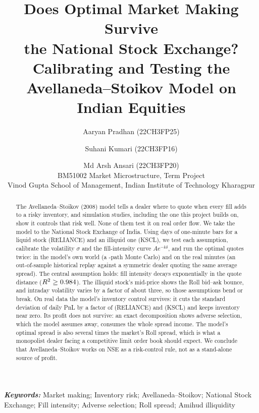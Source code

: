 \documentclass[11pt]{article}
\title{Does Optimal Market Making Survive\\ the National Stock Exchange?\\[4pt]
\large Calibrating and Testing the Avellaneda--Stoikov Model on Indian Equities}
\author{Aaryan Pradhan (22CH3FP25) \and Suhani Kumari (22CH3FP16) \and Md Arsh Ansari (22CH3FP20)\\[6pt]
\small BM51002 Market Microstructure, Term Project\\
\small Vinod Gupta School of Management, Indian Institute of Technology Kharagpur}
\date{}
\begin{document}
\maketitle

\begin{abstract}
\noindent The Avellaneda--Stoikov (2008) model tells a dealer where to quote when every fill adds to a
risky inventory, and simulation studies, including the one this project builds on, show it controls
that risk well. None of them test it on real order flow. We take the model to the National Stock
Exchange of India. Using \RELIANCEDays{} days of one-minute bars for a liquid stock (RELIANCE) and an
illiquid one (KSCL), we test each assumption, calibrate the volatility $\sigma$ and the fill-intensity
curve $Ae^{-k\delta}$, and run the optimal quotes twice: in the model's own world (a
\Paths-path Monte Carlo) and on the real minutes (an out-of-sample historical replay against a
symmetric dealer quoting the same average spread). The central assumption holds: fill intensity
decays exponentially in the quote distance ($R^2 \ge 0.984$). The illiquid stock's mid-price
shows the Roll bid--ask bounce, and intraday volatility varies by a factor of about three, so
those assumptions bend or break. On real data the model's inventory control survives: it cuts
the standard deviation of daily PnL by a factor of \RELIANCEReplaySdFactor{} (RELIANCE) and
\KSCLReplaySdFactor{} (KSCL) and keeps inventory near zero. Its profit does not survive: an exact
decomposition shows adverse selection, which the model assumes away, consumes the whole spread
income. The model's optimal spread is also several times the market's Roll spread, which is what a
monopolist dealer facing a competitive limit order book should expect. We conclude that
Avellaneda--Stoikov works on NSE as a risk-control rule, not as a stand-alone source of profit.
\end{abstract}

\noindent\textbf{\textit{Keywords:}} Market making; Inventory risk; Avellaneda--Stoikov;
National Stock Exchange; Fill intensity; Adverse selection; Roll spread; Amihud illiquidity














\appendix

\end{document}
